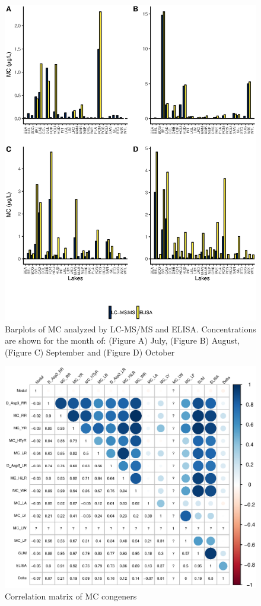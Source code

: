 \begin{figure}[p]
	\includegraphics[width=\textwidth]{figures/compare}
	\caption{Barplots of MC analyzed by LC-MS/MS and ELISA. Concentrations are shown for the month of: (Figure A) July, (Figure B) August, (Figure C) September and (Figure D) October}
	\label{fig:compare}
\end{figure}



\begin{figure}[p]
	\includegraphics[width=\textwidth]{figures/congener_matrix}
	\caption{Correlation matrix of MC congeners}
	\label{fig:congenermatrix}
\end{figure}



